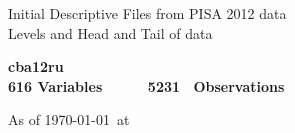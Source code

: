 \documentclass[11pt]{article}
\begin{document}
 
\setlength{\LTleft}{0pt plus 1fill minus 1fill}
\setlength{\LTright}{\LTleft}
\noindent
\setlength\tabcolsep{10pt} 
\def\arraystretch{1.5}
\small

\begingroup  
  \centering
  \LARGE Initial Descriptive Files from PISA 2012 data \\[1.5em]
  \Large Levels and Head and Tail of data  \\[1em]
\endgroup

\begin{center}\textbf{ cba12ru \\ 616 Variables~~~~~ 5231 ~Observations}
\\   \end{center}

\begin{center}\textnormal{ As of \today \ at \ \currenttime }
\end{center}
\end{document}
